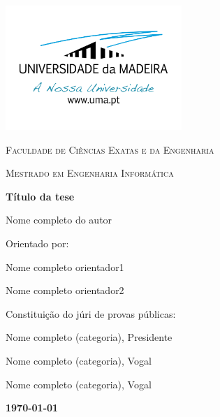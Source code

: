 \begin{titlepage}
\centering
\addtolength{\hoffset}{0.5cm}
    \centering
	\includegraphics[width=0.50\textwidth]{figures/logoUMa.png}\par\vspace{0.5cm}
	{\scshape\LARGE {} Faculdade de Ciências Exatas e da Engenharia \par}
	\vspace{1cm}
	{\scshape\Large Mestrado em Engenharia Informática \par}
	\vspace{1.5cm}
	{\huge\bfseries Título da tese \par}
	\vspace{2cm}
	{\Large Nome completo do autor\par}
	\vfill
	{\large Orientado por: \par}
	Nome completo orientador1 \par
	Nome completo orientador2 \par
	\vfill
	{\large Constituição do júri de provas públicas: \par}
		Nome completo (categoria), Presidente \par
		Nome completo (categoria), Vogal \par
		Nome completo (categoria), Vogal \par
	\vfill
	{\large \bfseries \today \par}
\end{titlepage}